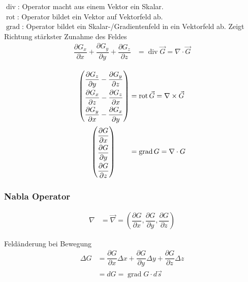 $\operatorname{div}$: Operator macht aus einem Vektor ein Skalar.\\
$\operatorname{rot}$: Operator bildet ein Vektor auf Vektorfeld ab.\\
$\operatorname{grad}$: Operator bildet ein Skalar-/Gradientenfeld in ein Vektorfeld ab.
Zeigt Richtung stärkster Zunahme des Feldes
\begin{align*}
    \dfrac{\partial G_x}{\partial x} + \dfrac{\partial G_y}{\partial y} + \dfrac{\partial G_z}{\partial z} &= \operatorname{div} \vec{G} = \nabla \cdot \vec{G}\\
\end{align*}
\begin{align*}
    \arraycolsep=1.0pt\def\arraystretch{2.0}
    \begin{pmatrix}
        \dfrac{\partial G_z}{\partial y} - \dfrac{\partial G_y}{\partial z} \\
        \dfrac{\partial G_x}{\partial z} - \dfrac{\partial G_z}{\partial x} \\
        \dfrac{\partial G_y}{\partial x} - \dfrac{\partial G_x}{\partial y} \\
    \end{pmatrix} & = \operatorname{rot} \vec{G} = \nabla \times \vec{G}                                 \\
    \arraycolsep=1.0pt\def\arraystretch{2.0}
    \begin{pmatrix}
        \dfrac{\partial G}{\partial x} \\
        \dfrac{\partial G}{\partial y} \\
        \dfrac{\partial G}{\partial z} \\
    \end{pmatrix} \qquad                                      & = \operatorname{grad} G = \nabla \cdot G
\end{align*}

\subsubsection*{Nabla Operator}

\begin{align*}
    \nabla &= \vec{\nabla} = \left( \dfrac{\partial G}{\partial x}, \dfrac{\partial G}{\partial y}, \dfrac{\partial G}{\partial z} \right)
\end{align*}

Feldänderung bei Bewegung
\begin{align*}
    \Delta G &= \dfrac{\partial G}{\partial x} \Delta x + \dfrac{\partial G}{\partial y} \Delta y + \dfrac{\partial G}{\partial z} \Delta z \\
             &= dG = \operatorname{grad} G \cdot d \vec{s}
\end{align*}

